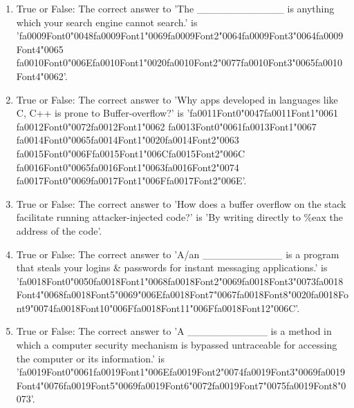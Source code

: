 \documentclass[12pt]{article}
\begin{document}
\begin{enumerate}[label=\arabic*.]
\item True or False: The correct answer to 'The \_\_\_\_\_\_\_\_\_\_\_\_ is anything which your search engine cannot search.' is '{\csname fa0009Font0\endcsname\char"0048}{\csname fa0009Font1\endcsname\char"0069}{\csname fa0009Font2\endcsname\char"0064}{\csname fa0009Font3\endcsname\char"0064}{\csname fa0009Font4\endcsname\char"0065} {\csname fa0010Font0\endcsname\char"006E}{\csname fa0010Font1\endcsname\char"0020}{\csname fa0010Font2\endcsname\char"0077}{\csname fa0010Font3\endcsname\char"0065}{\csname fa0010Font4\endcsname\char"0062}'.
\item True or False: The correct answer to 'Why apps developed in languages like C, C++ is prone to Buffer-overflow?' is '{\csname fa0011Font0\endcsname\char"0047}{\csname fa0011Font1\endcsname\char"0061} {\csname fa0012Font0\endcsname\char"0072}{\csname fa0012Font1\endcsname\char"0062} {\csname fa0013Font0\endcsname\char"0061}{\csname fa0013Font1\endcsname\char"0067} {\csname fa0014Font0\endcsname\char"0065}{\csname fa0014Font1\endcsname\char"0020}{\csname fa0014Font2\endcsname\char"0063} {\csname fa0015Font0\endcsname\char"006F}{\csname fa0015Font1\endcsname\char"006C}{\csname fa0015Font2\endcsname\char"006C} {\csname fa0016Font0\endcsname\char"0065}{\csname fa0016Font1\endcsname\char"0063}{\csname fa0016Font2\endcsname\char"0074} {\csname fa0017Font0\endcsname\char"0069}{\csname fa0017Font1\endcsname\char"006F}{\csname fa0017Font2\endcsname\char"006E}'.
\item True or False: The correct answer to 'How does a buffer overflow on the stack facilitate running attacker-injected code?' is 'By writing directly to \%eax the address of the code'.
\item True or False: The correct answer to 'A/an \_\_\_\_\_\_\_\_\_\_\_ is a program that steals your logins \& passwords for instant messaging applications.' is '{\csname fa0018Font0\endcsname\char"0050}{\csname fa0018Font1\endcsname\char"0068}{\csname fa0018Font2\endcsname\char"0069}{\csname fa0018Font3\endcsname\char"0073}{\csname fa0018Font4\endcsname\char"0068}{\csname fa0018Font5\endcsname\char"0069}{\char"006E}{\csname fa0018Font7\endcsname\char"0067}{\csname fa0018Font8\endcsname\char"0020}{\csname fa0018Font9\endcsname\char"0074}{\csname fa0018Font10\endcsname\char"006F}{\csname fa0018Font11\endcsname\char"006F}{\csname fa0018Font12\endcsname\char"006C}'.
\item True or False: The correct answer to 'A \_\_\_\_\_\_\_\_\_\_\_ is a method in which a computer security mechanism is bypassed untraceable for accessing the computer or its information.' is '{\csname fa0019Font0\endcsname\char"0061}{\csname fa0019Font1\endcsname\char"006E}{\csname fa0019Font2\endcsname\char"0074}{\csname fa0019Font3\endcsname\char"0069}{\csname fa0019Font4\endcsname\char"0076}{\csname fa0019Font5\endcsname\char"0069}{\csname fa0019Font6\endcsname\char"0072}{\csname fa0019Font7\endcsname\char"0075}{\csname fa0019Font8\endcsname\char"0073}'.

\end{enumerate}
\end{document}
